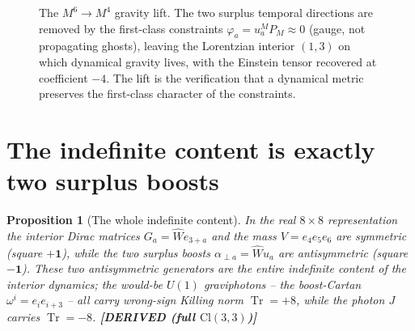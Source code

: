 \documentclass[11pt,oneside]{book}
\newcommand{\Wh}{\hat{W}}                         %
\newcommand{\Cl}{\mathrm{Cl}}                     %
\newcommand{\Tr}{\operatorname{Tr}}
\newcommand{\RR}{\mathbb{R}}
\newcommand{\status}[1]{{\sffamily\bfseries\color{statuscol}[#1]}}
\theoremstyle{plain}
\newtheorem{proposition}[theorem]{Proposition}
\theoremstyle{definition}
\theoremstyle{remark}
\begin{document}
\begin{figure}[tbp]
\centering
{}
\caption{The $M^6\to M^4$ gravity lift. The two surplus temporal directions are
removed by the first-class constraints $\varphi_a=u_a^MP_M\approx0$ (gauge, not
propagating ghosts), leaving the Lorentzian interior $(1,3)$ on which dynamical
gravity lives, with the Einstein tensor recovered at coefficient $-4$. The lift is
the verification that a dynamical metric preserves the first-class character of the
constraints.}
\label{fig:lift}
\end{figure}

\section{The indefinite content is exactly two surplus boosts}
\label{sec:two-boosts}

\begin{proposition}[The whole indefinite content]
\label{prop:indefinite}
In the real $8\times8$ representation the interior Dirac matrices $G_a=\Wh e_{3+a}$
and the mass $V=e_4e_5e_6$ are symmetric (square $+\mathbf 1$), while the two
\emph{surplus boosts} $\alpha_{\perp a}=\Wh u_a$ are antisymmetric (square
$-\mathbf 1$). These two antisymmetric generators are the entire indefinite content
of the interior dynamics; the would-be $U(1)$ graviphotons -- the boost-Cartan
$\omega^i=e_ie_{i+3}$ -- all carry wrong-sign Killing norm $\Tr=+8$, while the
photon $J$ carries $\Tr=-8$. \status{DERIVED (full $\Cl(3,3)$)}
\end{proposition}
\end{document}
